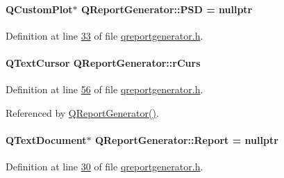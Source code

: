 \hypertarget{class_q_report_generator_a8363c2cf697c443a9d58b223efddde02}{}
\paragraph[{P\+S\+D}]{\setlength{\rightskip}{0pt plus 5cm}Q\+Custom\+Plot$\ast$ Q\+Report\+Generator\+::\+P\+S\+D = nullptr}\label{class_q_report_generator_a8363c2cf697c443a9d58b223efddde02}


Definition at line \hyperlink{qreportgenerator_8h_source_l00033}{33} of file \hyperlink{qreportgenerator_8h_source}{qreportgenerator.\+h}.

\hypertarget{class_q_report_generator_af189d3779d26af513e311eea89a78a28}{}
\paragraph[{r\+Curs}]{\setlength{\rightskip}{0pt plus 5cm}Q\+Text\+Cursor Q\+Report\+Generator\+::r\+Curs\hspace{0.3cm}{\ttfamily [private]}}\label{class_q_report_generator_af189d3779d26af513e311eea89a78a28}


Definition at line \hyperlink{qreportgenerator_8h_source_l00056}{56} of file \hyperlink{qreportgenerator_8h_source}{qreportgenerator.\+h}.



Referenced by \hyperlink{qreportgenerator_8cpp_source_l00004}{Q\+Report\+Generator()}.

\hypertarget{class_q_report_generator_ab051048608bc51151bc0b1ffc217f292}{}
\paragraph[{Report}]{\setlength{\rightskip}{0pt plus 5cm}Q\+Text\+Document$\ast$ Q\+Report\+Generator\+::\+Report = nullptr}\label{class_q_report_generator_ab051048608bc51151bc0b1ffc217f292}


Definition at line \hyperlink{qreportgenerator_8h_source_l00030}{30} of file \hyperlink{qreportgenerator_8h_source}{qreportgenerator.\+h}.



